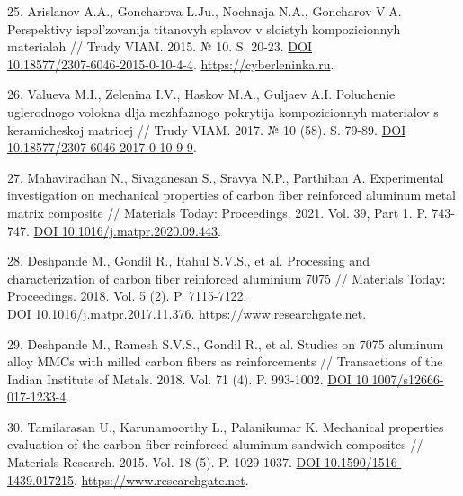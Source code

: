 \begin{references}
25. Arislanov A.A., Goncharova L.Ju., Nochnaja N.A., Goncharov
V.A. Perspektivy ispol'zovanija titan\-ovyh splavov v sloistyh
kompozicionnyh materialah // Trudy VIAM. 2015. №
10. S. 20-23. \href{https://dx.doi.org/10.18577/2307-6046-2015-0-10-4-4}{DOI \\10.18577/2307-6046-2015-0-10-4-4}. \href{https://cyberleninka.ru/article/n/perspektivy-ispolzovaniya-titanovyh-splavov-v-sloistyh-kompozitsionnyh-materialah/viewer}{https://cyberleninka.ru}.

26. Valueva M.I., Zelenina I.V., Haskov M.A., Guljaev A.I. Poluchenie
uglerodnogo volokna dlja mezhfaz\-nogo pokrytija kompozicionnyh
materialov s keramicheskoj matricej // Trudy VIAM. 2017. № 10
(58). S. 79-89. \href{https://doi.org/10.18577/2307-6046-2017-0-10-9-9}{DOI 10.18577/2307-6046-2017-0-10-9-9}.

27. Mahaviradhan N., Sivaganesan S., Sravya N.P., Parthiban
A. Experimental investigation on mechanical properties of carbon fiber
reinforced aluminum metal matrix composite // Materials Today:
Proceedings. 2021. Vol. 39, Part
1. P. 743-747. \href{http://dx.doi.org/10.1016/j.matpr.2020.09.443}{DOI 10.1016/j.matpr.2020.09.443}.

28. Deshpande M., Gondil R., Rahul S.V.S., et al. Processing and
characterization of carbon fiber reinforced aluminium 7075 //
Materials Today: Proceedings. 2018. Vol. 5
(2). P. 7115-7122. \\\href{http://dx.doi.org/10.1016/j.matpr.2017.11.376}{DOI 10.1016/j.matpr.2017.11.376}. \href{https://www.researchgate.net/publication/312780136_Processing_of_Carbon_fiber_reinforced_Aluminium_7075_metal_matrix_composite}{https://www.researchgate.net}.

29. Deshpande M., Ramesh S.V.S., Gondil R., et al. Studies on 7075
aluminum alloy MMCs with milled carbon fibers as reinforcements //
Transactions of the Indian Institute of Metals. 2018. Vol. 71
(4). P. 993-1002. \href{https://doi.org/10.1007/s12666-017-1233-4}{DOI 10.1007/s12666-017-1233-4}.

30. Tamilarasan U., Karunamoorthy L., Palanikumar K. Mechanical
properties evaluation of the carbon fiber reinforced aluminum sandwich
composites // Materials Research. 2015. Vol. 18
(5). P. 1029-1037. \href{http://dx.doi.org/10.1590/1516-1439.017215}{DOI 10.1590/1516-1439.017215}. \href{https://www.researchgate.net/publication/283618484_Mechanical_Properties_Evaluation_of_the_Carbon_Fibre_Reinforced_Aluminium_Sandwich_Composites}{https://www.researchgate.net}.


\end{references}

